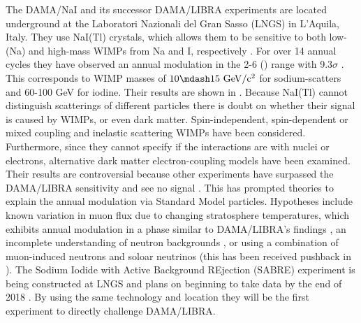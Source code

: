 The DAMA/NaI and its successor DAMA/LIBRA experiments are located underground at the Laboratori Nazionali del Gran Sasso (LNGS) in
L'Aquila, Italy.  They use NaI(Tl) crystals, which allows them to be sensitive to both low- (Na) and high-mass WIMPs from Na and I,
respectively .  For over 14 annual cycles they have observed an annual modulation in the
2-6 \kevee ()
range with 9.3$\sigma$ .  This corresponds to WIMP masses of $10 \mdash 15\ \mathrm{GeV/c^2}$ for sodium-scatters
and 60-100 GeV for iodine.  Their results are shown in .  Because NaI(Tl) cannot distinguish scatterings of different
particles there is doubt on whether their signal
is caused by WIMPs, or even dark matter.  Spin-independent, spin-dependent or mixed coupling 
and inelastic scattering  WIMPs 
have been considered.  Furthermore, since they cannot specify if the interactions are with nuclei or electrons, alternative dark matter
electron-coupling models  have been examined.  Their results are controversial because other experiments
have surpassed the DAMA/LIBRA sensitivity and see no signal .  This has prompted theories to explain the annual
modulation via
Standard Model particles.  Hypotheses include known variation in muon flux due to changing stratosphere temperatures, which exhibits
annual modulation in a phase similar to DAMA/LIBRA's findings , an incomplete understanding of neutron backgrounds
, or using a combination of muon-induced neutrons and soloar neutrinos  (this
has been received pushback in ).  The Sodium Iodide with Active Background REjection (SABRE) experiment
is being constructed at LNGS and plans on beginning to take data by the end of 2018 .  By using the same
technology and location they will be the first experiment to directly challenge DAMA/LIBRA.

